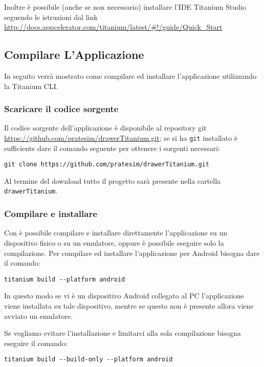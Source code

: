     Inoltre è possibile (anche se non necessario) installare l'IDE Titanium
    Studio seguendo le istruzioni dal link \url{http://docs.appcelerator.com/titanium/latest/#!/guide/Quick_Start}
    \subsection{Compilare L'Applicazione}
    In seguito verrà mostrato come compilare ed installare l'applicazione
    utilizzando la Titanium CLI.
        \subsubsection{Scaricare il codice sorgente}
        Il codice sorgente dell'applicazione \tisdk{} è disponibile al 
            repository git 
            \url{https://github.com/pratesim/drawerTitanium.git}; se si ha 
            \texttt{git} installato è sufficiente dare il comando seguente per 
            ottenere i sorgenti necessari:
            \begin{lstlisting}[language=plane]
 git clone https://github.com/pratesim/drawerTitanium.git
            \end{lstlisting}
            Al termine del download tutto il progetto sarà presente nella 
            cartella\\ \texttt{drawerTitanium}.
        \subsubsection{Compilare e installare}
            Con \tisdk{} è possibile compilare e installare direttamente
            l'applicazione su un dispositivo fisico o su un emulatore, oppure
            è possibile eseguire solo la compilazione.
            Per compilare ed installare l'applicazione per Android 
            bisogna dare il comando:
        \begin{lstlisting}[language=plane]
 titanium build --platform android
        \end{lstlisting}
        In questo modo se vi è un dispositivo Android collegato al PC
        l'applicazione viene installata su tale dispositivo, mentre se questo
        non è presente allora viene avviato un emulatore.

        Se vogliamo evitare l'installazione e limitarci alla sola compilazione
        bisogna eseguire il comando:
        \begin{lstlisting}[language=plane]
 titanium build --build-only --platform android
        \end{lstlisting}
